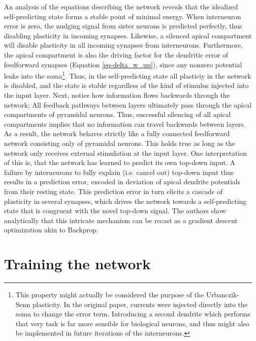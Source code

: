 An analysis of the equations describing the network reveals that the idealized self-predicting state forms a stable
point of minimal energy. When interneuron error is zero, the nudging signal from sister neurons is predicted perfectly,
thus disabling plasticity in incoming synapses. Likewise, a silenced apical compartment will disable plasticity in all
incoming synapses from interneurons. Furthermore, the apical compartment is also the driving factor for the dendritic
error of feedforward synapses (Equation \ref{eq-delta_w_up}), since any nonzero potential leaks into the
soma\footnote{This property might actually be considered the purpose of the Urbanczik-Senn plasticity. In the original
paper, currents were injected directly into the soma to change the error term. Introducing a second dendrite which
performs that very task is far more sensible for biological neurons, and thus might also be implemented in future
iterations of the interneurons.}. Thus, in the self-predicting state all plasticiy in the network is disabled, and the
state is stable regardless of the kind of stimulus injected into the input layer. Next, notice how information flows
backwards through the network; All feedback pathways between layers ultimately pass through the apical compartments of
pyramidal neurons. Thus, successful silencing of all apical compartments implies that no information can travel
backwards between layers. As a result, the network behaves strictly like a fully connected feedforward network
consisting only of pyramidal neurons. This holds true as long as the network only receives external stimulation at the
input layer. One interpretation of this is, that the network has learned to predict its own top-down input. A failure by
interneurons to fully explain (i.e. cancel out) top-down input thus results in a prediction error, encoded in deviation
of apical dendrite potentials from their resting state. This prediction error in turn elicits a cascade of plasticity in
several synapses, which drives the network towards a self-predicting state that is congruent with the novel top-down
signal. The authors show analytically that this intricate mechanism can be recast as a gradient descent optimization
akin to Backprop.



\section{Training the network}

